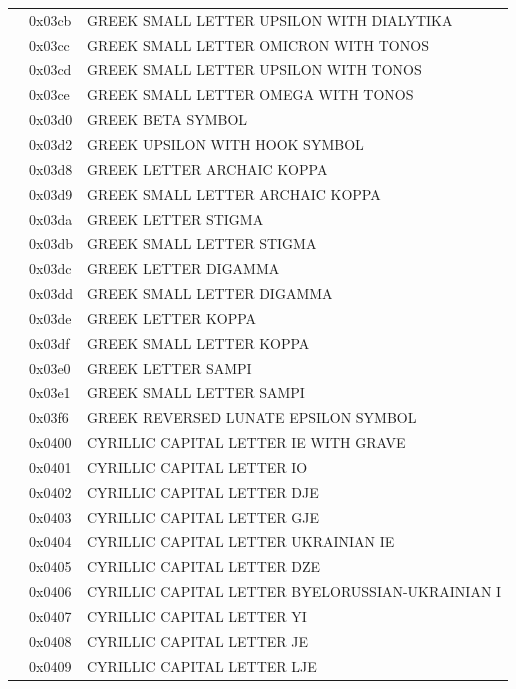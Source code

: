 \documentclass[12pt, twoside]{article}
\begin{document}
\begin{longtable}{L{1.0cm} L{2.0cm} >{\footnotesize}L{10cm}}
&0x03cb&GREEK SMALL LETTER UPSILON WITH DIALYTIKA\\
&0x03cc&GREEK SMALL LETTER OMICRON WITH TONOS\\
&0x03cd&GREEK SMALL LETTER UPSILON WITH TONOS\\
&0x03ce&GREEK SMALL LETTER OMEGA WITH TONOS\\
&0x03d0&GREEK BETA SYMBOL\\
&0x03d2&GREEK UPSILON WITH HOOK SYMBOL\\
&0x03d8&GREEK LETTER ARCHAIC KOPPA\\
&0x03d9&GREEK SMALL LETTER ARCHAIC KOPPA\\
&0x03da&GREEK LETTER STIGMA\\
&0x03db&GREEK SMALL LETTER STIGMA\\
&0x03dc&GREEK LETTER DIGAMMA\\
&0x03dd&GREEK SMALL LETTER DIGAMMA\\
&0x03de&GREEK LETTER KOPPA\\
&0x03df&GREEK SMALL LETTER KOPPA\\
&0x03e0&GREEK LETTER SAMPI\\
&0x03e1&GREEK SMALL LETTER SAMPI\\
&0x03f6&GREEK REVERSED LUNATE EPSILON SYMBOL\\
&0x0400&CYRILLIC CAPITAL LETTER IE WITH GRAVE\\
&0x0401&CYRILLIC CAPITAL LETTER IO\\
&0x0402&CYRILLIC CAPITAL LETTER DJE\\
&0x0403&CYRILLIC CAPITAL LETTER GJE\\
&0x0404&CYRILLIC CAPITAL LETTER UKRAINIAN IE\\
&0x0405&CYRILLIC CAPITAL LETTER DZE\\
&0x0406&CYRILLIC CAPITAL LETTER BYELORUSSIAN-UKRAINIAN I\\
&0x0407&CYRILLIC CAPITAL LETTER YI\\
&0x0408&CYRILLIC CAPITAL LETTER JE\\
&0x0409&CYRILLIC CAPITAL LETTER LJE\\

\end{longtable}
\end{document}
